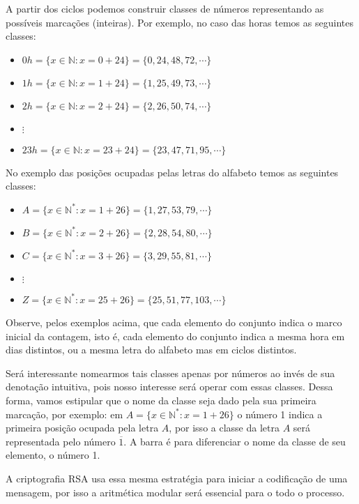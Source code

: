 A partir dos ciclos podemos construir classes de n\'{u}meros representando as poss\'{i}veis marca\c{c}\~{o}es (inteiras). Por exemplo,  
no caso das horas temos as seguintes classes:  

\begin{itemize}
	\item $0h=\{x\in\mathbb{N}: x=0+24\}=\{0, 24, 48, 72, \cdots\}$ 
	\item $1h=\{x\in\mathbb{N}: x=1+24\}=\{1, 25, 49, 73, \cdots\}$
	\item $2h=\{x\in\mathbb{N}: x=2+24\}=\{2, 26, 50, 74, \cdots\}$
	\item $\vdots$
	\item $23h=\{x\in\mathbb{N}: x=23+24\}=\{23, 47, 71, 95, \cdots\}$
\end{itemize}

No exemplo das posi\c{c}\~{o}es ocupadas pelas letras do alfabeto temos as seguintes classes: 

\begin{itemize}
	\item $A=\{x\in\mathbb{N^*}: x=1+26\}=\{1, 27, 53, 79, \cdots\}$ 
	\item $B=\{x\in\mathbb{N^*}: x=2+26\}=\{2, 28, 54, 80, \cdots\}$
	\item $C=\{x\in\mathbb{N^*}: x=3+26\}=\{3, 29, 55, 81, \cdots\}$
	\item $\vdots$
	\item $Z=\{x\in\mathbb{N^*}: x=25+26\}=\{25, 51, 77, 103, \cdots\}$
\end{itemize}

Observe, pelos exemplos acima, que cada elemento do conjunto indica o marco inicial da contagem, isto \'{e}, cada elemento do conjunto indica a mesma hora em dias distintos, ou a mesma letra do alfabeto mas em ciclos distintos.

Ser\'{a} interessante nomearmos tais classes apenas por n\'{u}meros ao inv\'{e}s de sua denota\c{c}\~{a}o intuitiva, pois nosso interesse ser\'{a} operar com essas classes. Dessa forma, vamos estipular que o nome da classe seja dado pela sua 
primeira marca\c{c}\~{a}o, por exemplo: em $A=\{x\in\mathbb{N^*}: x=1+26\}$ o n\'{u}mero 1 indica a primeira posi\c{c}\~{a}o ocupada pela letra $A$, por isso a classe da letra $A$ ser\'{a} representada pelo n\'{u}mero $\overline{1}$. A barra \'{e} 
para diferenciar o nome da classe de seu elemento, o n\'{u}mero 1. 

A criptografia RSA usa essa mesma estrat\'{e}gia para iniciar a codifica\c{c}\~{a}o de uma mensagem, por isso a aritm\'{e}tica
modular ser\'{a} essencial para o todo o processo. 
 
